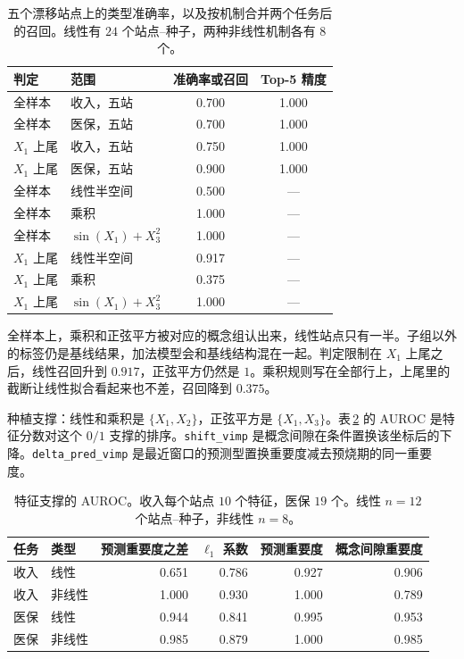 \documentclass[11pt,a4paper,fontset=none]{ctexart}
\begin{document}
\begin{table}[ht]
\centering
\caption{五个漂移站点上的类型准确率，以及按机制合并两个任务后的召回。线性有 \(24\) 个站点--种子，两种非线性机制各有 \(8\) 个。}
\label{tab:type}
\small
\begin{tabular}{@{}llcc@{}}
\toprule
判定 & 范围 & 准确率或召回 & Top-5 精度 \\
\midrule
全样本 & 收入，五站 & 0.700 & 1.000 \\
全样本 & 医保，五站 & 0.700 & 1.000 \\
\(X_1\) 上尾 & 收入，五站 & 0.750 & 1.000 \\
\(X_1\) 上尾 & 医保，五站 & 0.900 & 1.000 \\
\midrule
全样本 & 线性半空间 & 0.500 & --- \\
全样本 & 乘积 & 1.000 & --- \\
全样本 & \(\sin(X_1)+X_3^{2}\) & 1.000 & --- \\
\(X_1\) 上尾 & 线性半空间 & 0.917 & --- \\
\(X_1\) 上尾 & 乘积 & 0.375 & --- \\
\(X_1\) 上尾 & \(\sin(X_1)+X_3^{2}\) & 1.000 & --- \\
\bottomrule
\end{tabular}
\end{table}

全样本上，乘积和正弦平方被对应的概念组认出来，线性站点只有一半。子组以外的标签仍是基线结果，加法模型会和基线结构混在一起。判定限制在 \(X_1\) 上尾之后，线性召回升到 \(0.917\)，正弦平方仍然是 \(1\)。乘积规则写在全部行上，上尾里的截断让线性拟合看起来也不差，召回降到 \(0.375\)。

种植支撑：线性和乘积是 \(\{X_1,X_2\}\)，正弦平方是 \(\{X_1,X_3\}\)。表\,\ref{tab:feature} 的 AUROC 是特征分数对这个 \(0/1\) 支撑的排序。\texttt{shift\_vimp} 是概念间隙在条件置换该坐标后的下降。\texttt{delta\_pred\_vimp} 是最近窗口的预测型置换重要度减去预烧期的同一重要度。

\begin{table}[ht]
\centering
\caption{特征支撑的 AUROC。收入每个站点 \(10\) 个特征，医保 \(19\) 个。线性 \(n=12\) 个站点--种子，非线性 \(n=8\)。}
\label{tab:feature}
\small
\begin{tabular}{@{}llrrrr@{}}
\toprule
任务 & 类型 & 预测重要度之差 & \(\ell_1\) 系数 & 预测重要度 & 概念间隙重要度 \\
\midrule
收入 & 线性 & 0.651 & 0.786 & 0.927 & 0.906 \\
收入 & 非线性 & 1.000 & 0.930 & 1.000 & 0.789 \\
医保 & 线性 & 0.944 & 0.841 & 0.995 & 0.953 \\
医保 & 非线性 & 0.985 & 0.879 & 1.000 & 0.985 \\
\bottomrule
\end{tabular}
\end{table}
\end{document}
